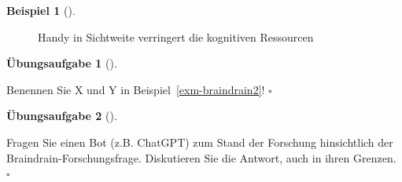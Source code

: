 \documentclass[
  a4paper,
  DIV=11]{scrreprt}
\theoremstyle{definition}
\newtheorem{exercise}{Übungsaufgabe}[chapter]
\theoremstyle{definition}
\newtheorem{example}{Beispiel}[chapter]
\theoremstyle{definition}
\theoremstyle{remark}
\begin{document}
\begin{example}[]
\begin{figure}


\caption{\label{fig-braindrain}Handy in Sichtweite verringert die
kognitiven Ressourcen}

\end{figure}%

\end{example}

\begin{exercise}[]\protect\hypertarget{exr-braindrain1}{}\label{exr-braindrain1}

Benennen Sie X und Y in Beispiel~\ref{exm-braindrain2}! \(\square\)

\end{exercise}

\begin{exercise}[]\protect\hypertarget{exr-braindrain-chatgpt}{}\label{exr-braindrain-chatgpt}

Fragen Sie einen Bot (z.B. ChatGPT) zum Stand der Forschung hinsichtlich
der Braindrain-Forschungsfrage. Diskutieren Sie die Antwort, auch in
ihren Grenzen. \(\square\)

\end{exercise}
\end{document}
